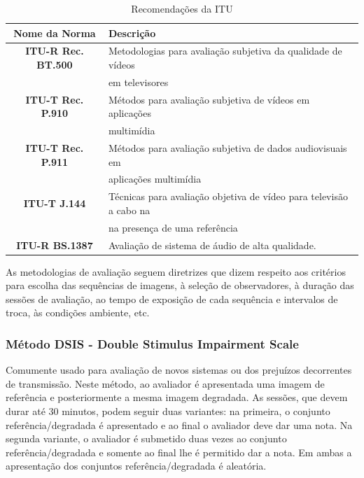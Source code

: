 \begin{table}[!h]
	\centering
	\caption{Recomendações da ITU}
	\label{tab:recomendacoes}
	\begin{tabular}{c|l}
		\hline
		\textbf{Nome da Norma} & Descrição \\
		\hline
		\textbf{ITU-R Rec. BT.500} & Metodologias para avaliação subjetiva da qualidade de vídeos \\
			& em televisores \\
		\textbf{ITU-T Rec. P.910} & Métodos para avaliação subjetiva de vídeos em aplicações \\
			& multimídia \\
		\textbf{ITU-T Rec. P.911} & Métodos para avaliação subjetiva de dados audiovisuais em \\
			& aplicações multimídia \\
		\textbf{ITU-T J.144} & Técnicas para avaliação objetiva de vídeo para televisão a cabo na \\
			& na presença de uma referência \\
		\textbf{ITU-R BS.1387} & Avaliação de sistema de áudio de alta qualidade. \\
		\hline
	\end{tabular}
\end{table}

As metodologias de avaliação seguem diretrizes que dizem respeito aos critérios para escolha das sequências de imagens, à seleção de observadores, à duração das sessões de avaliação, ao tempo de exposição de cada sequência e intervalos de troca, às condições ambiente, etc.

\subsubsection[Método DSIS]{Método DSIS - Double Stimulus Impairment Scale}

Comumente usado para avaliação de novos sistemas ou dos prejuízos decorrentes de transmissão. Neste método, ao avaliador é apresentada uma imagem de referência e posteriormente a mesma imagem degradada. As sessões, que devem durar até 30 minutos, podem seguir duas variantes: na primeira, o conjunto referência/degradada é apresentado e ao final o avaliador deve dar uma nota. Na segunda variante, o avaliador é submetido duas vezes ao conjunto referência/degradada e somente ao final lhe é permitido dar a nota. Em ambas a apresentação dos conjuntos referência/degradada é aleatória.

